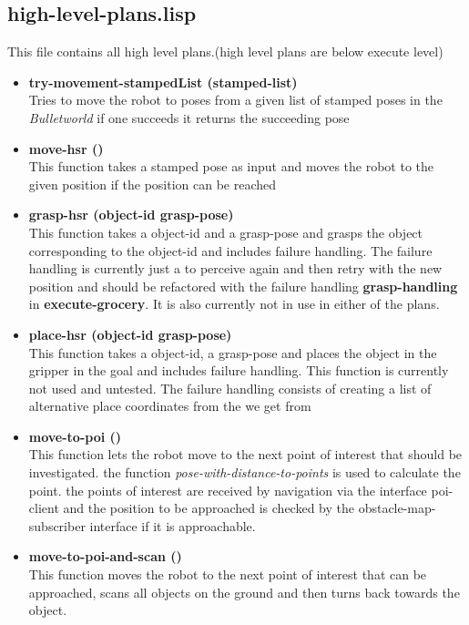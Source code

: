\documentclass[main.tex]{subfiles}
\begin{document}
	    \subsection{high-level-plans.lisp}
	    \label{high-level}
	    This file contains all high level plans.(high level plans are below execute level)
	    \begin{itemize}
		\item \textbf{try-movement-stampedList (stamped-list)} \\
		Tries to move the robot to poses from a given list of stamped poses in the \textit{Bulletworld} if one succeeds it returns the succeeding pose 
	    \item \textbf{move-hsr ()} \\
	    This function takes a stamped pose as input and moves the robot to the given position if the position can be reached
	    \item \textbf{grasp-hsr (object-id grasp-pose)} \\
	    This function takes a object-id and a grasp-pose and grasps the object corresponding to the object-id and includes failure handling. The failure handling is currently just a to perceive again and then retry with the new position and should be refactored with the failure handling \textbf{grasp-handling} in \textbf{execute-grocery}.
	    It is also currently not in use in either of the plans.
	    \item \textbf{place-hsr (object-id grasp-pose)} \\
	    This function takes a object-id, a grasp-pose and places the object in the gripper in the goal and includes failure handling. This function is currently not used and untested. The failure handling consists of creating a list of alternative place coordinates from the we get from 
	    \item \textbf{move-to-poi ()} \\
	    This function lets the robot move to the next point of interest that should be investigated. the function \textit{pose-with-distance-to-points} is used to calculate the point. the points of interest are received by navigation via the interface poi-client and the position to be approached is checked by the obstacle-map-subscriber interface if it is approachable.
	    \item \textbf{move-to-poi-and-scan ()} \\
	    This function moves the robot to the next point of interest that can be approached, scans all objects on the ground and then turns back towards the object.

\end{itemize}
\end{document}
